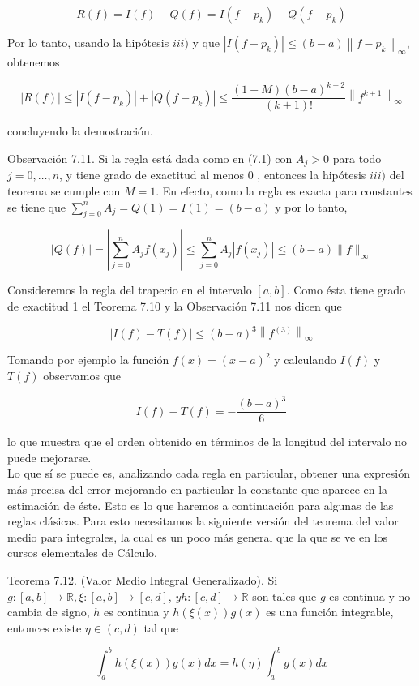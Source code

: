 \documentclass[10pt]{book}
\begin{document}
$$
R(f)=I(f)-Q(f)=I\left(f-p_{k}\right)-Q\left(f-p_{k}\right)
$$

Por lo tanto, usando la hipótesis $i i i)$ y que $\left|I\left(f-p_{k}\right)\right| \leq(b-a)\left\|f-p_{k}\right\|_{\infty}$, obtenemos

$$
|R(f)| \leq\left|I\left(f-p_{k}\right)\right|+\left|Q\left(f-p_{k}\right)\right| \leq \frac{(1+M)(b-a)^{k+2}}{(k+1)!}\left\|f^{k+1}\right\|_{\infty}
$$

concluyendo la demostración.

Observación 7.11. Si la regla está dada como en (7.1) con $A_{j}>0$ para todo $j=0, \ldots, n$, y tiene grado de exactitud al menos 0 , entonces la hipótesis $i i i)$ del teorema se cumple con $M=1$. En efecto, como la regla es exacta para constantes se tiene que $\sum_{j=0}^{n} A_{j}=Q(1)=I(1)=(b-a)$ y por lo tanto,

$$
|Q(f)|=\left|\sum_{j=0}^{n} A_{j} f\left(x_{j}\right)\right| \leq \sum_{j=0}^{n} A_{j}\left|f\left(x_{j}\right)\right| \leq(b-a)\|f\|_{\infty}
$$

Consideremos la regla del trapecio en el intervalo $[a, b]$. Como ésta tiene grado de exactitud 1 el Teorema 7.10 y la Observación 7.11 nos dicen que

$$
|I(f)-T(f)| \leq(b-a)^{3}\left\|f^{(3)}\right\|_{\infty}
$$

Tomando por ejemplo la función $f(x)=(x-a)^{2}$ y calculando $I(f)$ y $T(f)$ observamos que

$$
I(f)-T(f)=-\frac{(b-a)^{3}}{6}
$$

lo que muestra que el orden obtenido en términos de la longitud del intervalo no puede mejorarse.\\
Lo que sí se puede es, analizando cada regla en particular, obtener una expresión más precisa del error mejorando en particular la constante que aparece en la estimación de éste. Esto es lo que haremos a continuación para algunas de las reglas clásicas. Para esto necesitamos la siguiente versión del teorema del valor medio para integrales, la cual es un poco más general que la que se ve en los cursos elementales de Cálculo.

Teorema 7.12. (Valor Medio Integral Generalizado). Si $g:[a, b] \rightarrow \mathbb{R}, \xi:[a, b] \rightarrow[c, d]$, $y h:[c, d] \rightarrow \mathbb{R}$ son tales que $g$ es continua y no cambia de signo, $h$ es continua y $h(\xi(x)) g(x)$ es una función integrable, entonces existe $\eta \in(c, d)$ tal que

$$
\int_{a}^{b} h(\xi(x)) g(x) d x=h(\eta) \int_{a}^{b} g(x) d x
$$
\end{document}

